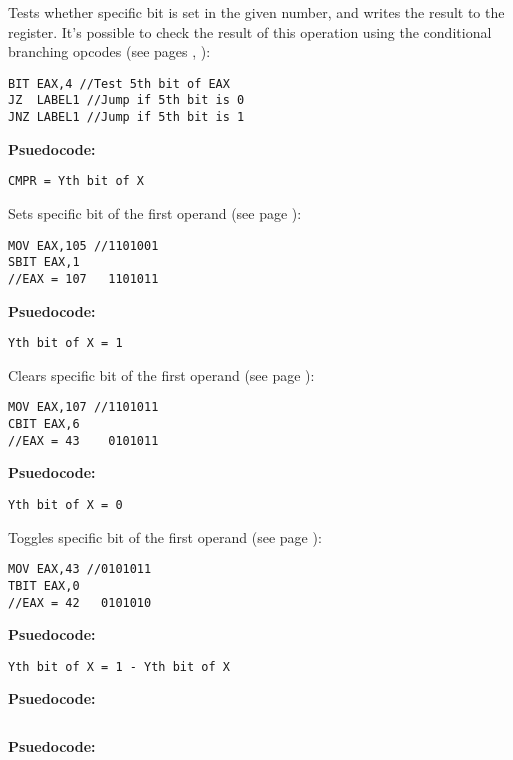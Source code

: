 Tests whether specific bit is set in the given number, and writes the result to the  register. It's possible to check the result of this operation using the conditional branching opcodes (see pages \pageref{branchbit}, \pageref{bitwiseops}):
\begin{verbatim}
BIT EAX,4 //Test 5th bit of EAX
JZ  LABEL1 //Jump if 5th bit is 0
JNZ LABEL1 //Jump if 5th bit is 1
\end{verbatim}

\textbf{Psuedocode:}
\begin{verbatim}
CMPR = Yth bit of X
\end{verbatim}


Sets specific bit of the first operand (see page \pageref{bitwiseops}):
\begin{verbatim}
MOV EAX,105 //1101001
SBIT EAX,1
//EAX = 107   1101011
\end{verbatim}

\textbf{Psuedocode:}
\begin{verbatim}
Yth bit of X = 1
\end{verbatim}


Clears specific bit of the first operand (see page \pageref{bitwiseops}):
\begin{verbatim}
MOV EAX,107 //1101011
CBIT EAX,6
//EAX = 43    0101011
\end{verbatim}

\textbf{Psuedocode:}
\begin{verbatim}
Yth bit of X = 0
\end{verbatim}


Toggles specific bit of the first operand (see page \pageref{bitwiseops}):
\begin{verbatim}
MOV EAX,43 //0101011
TBIT EAX,0
//EAX = 42   0101010
\end{verbatim}

\textbf{Psuedocode:}
\begin{verbatim}
Yth bit of X = 1 - Yth bit of X
\end{verbatim}



\textbf{Psuedocode:}
\begin{verbatim}
\end{verbatim}



\textbf{Psuedocode:}
\begin{verbatim}
\end{verbatim}


